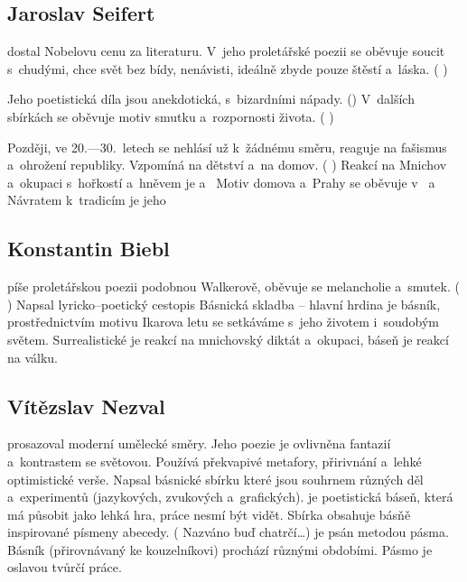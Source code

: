\subsection*{Jaroslav Seifert}
 dostal Nobelovu cenu za literaturu.
V~jeho proletářské poezii se oběvuje soucit s~chudými, chce svět bez
bídy, nenávisti, ideálně zbyde pouze štěstí a~láska. ( )

Jeho poetistická díla jsou anekdotická, s~bizardními nápady.
() V~dalších sbírkách se oběvuje motiv smutku a~rozpornosti života.
( )

Později, ve 20.---30.~letech se nehlásí už k~žádnému směru, reaguje na
fašismus a~ohrožení republiky. Vzpomíná na dětství a~na domov.
( )
Reakcí na Mnichov a~okupaci s~hořkostí a~hněvem je  a~
Motiv domova a~Prahy se oběvuje v~ a~
Návratem k~tradicím je jeho 

\subsection*{Konstantin Biebl}
 píše proletářskou poezii podobnou Walkerově,
oběvuje se melancholie a~smutek. ( ) Napsal lyricko--poetický cestopis  Básnická skladba  -- hlavní hrdina je básník,
prostřednictvím motivu Ikarova letu se setkáváme s~jeho životem i~soudobým světem.
Surrealistické  je reakcí na mnichovský diktát a~okupaci,
báseň  je reakcí na válku.

\subsection*{Vítězslav Nezval}
 prosazoval moderní umělecké směry. Jeho poezie
je ovlivněna fantazií a~kontrastem se světovou. Používá překvapivé
metafory, přirivnání a~lehké optimistické verše.  Napsal básnické sbírku
  které jsou souhrnem různých děl
a~experimentů (jazykových, zvukových a~grafických).  je poetistická báseň, která má působit jako lehká hra, práce
nesmí být vidět. Sbírka  obsahuje básňě inspirované
písmeny abecedy. ( Nazváno buď chatrčí\dots{})  je psán metodou pásma. Básník (přirovnávaný ke kouzelníkovi)
prochází různými obdobími. Pásmo je oslavou tvůrčí práce.

